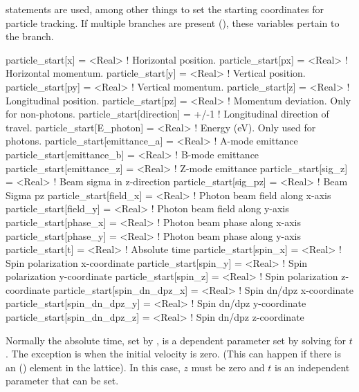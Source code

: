  statements are used, among other things to set the starting coordinates
for particle tracking. If multiple branches are present (), these
variables pertain to the  branch.
\begin{example}
  particle_start[x]                   = <Real>   ! Horizontal position.
  particle_start[px]                  = <Real>   ! Horizontal momentum.
  particle_start[y]                   = <Real>   ! Vertical position.
  particle_start[py]                  = <Real>   ! Vertical momentum.
  particle_start[z]                   = <Real>   ! Longitudinal position.
  particle_start[pz]                  = <Real>   ! Momentum deviation. Only for non-photons.
  particle_start[direction]           = +/-1     ! Longitudinal direction of travel.
  particle_start[E_photon]            = <Real>   ! Energy (eV). Only used for photons.
  particle_start[emittance_a]         = <Real>   ! A-mode emittance
  particle_start[emittance_b]         = <Real>   ! B-mode emittance
  particle_start[emittance_z]         = <Real>   ! Z-mode emittance
  particle_start[sig_z]               = <Real>   ! Beam sigma in z-direction
  particle_start[sig_pz]              = <Real>   ! Beam Sigma pz 
  particle_start[field_x]             = <Real>   ! Photon beam field along x-axis
  particle_start[field_y]             = <Real>   ! Photon beam field along y-axis
  particle_start[phase_x]             = <Real>   ! Photon beam phase along x-axis
  particle_start[phase_y]             = <Real>   ! Photon beam phase along y-axis
  particle_start[t]                   = <Real>   ! Absolute time
  particle_start[spin_x]              = <Real>   ! Spin polarization x-coordinate
  particle_start[spin_y]              = <Real>   ! Spin polarization y-coordinate
  particle_start[spin_z]              = <Real>   ! Spin polarization z-coordinate
  particle_start[spin_dn_dpz_x]       = <Real>   ! Spin dn/dpz x-coordinate
  particle_start[spin_dn_dpz_y]       = <Real>   ! Spin dn/dpz y-coordinate
  particle_start[spin_dn_dpz_z]       = <Real>   ! Spin dn/dpz z-coordinate
\end{example}
Normally the absolute time, set by , is a dependent
parameter set by solving  for $t$. The exception is when the
initial velocity is zero. (This can happen if there is an 
() element in the lattice). In this case, $z$ must be
zero and $t$ is an independent parameter that can be set.

